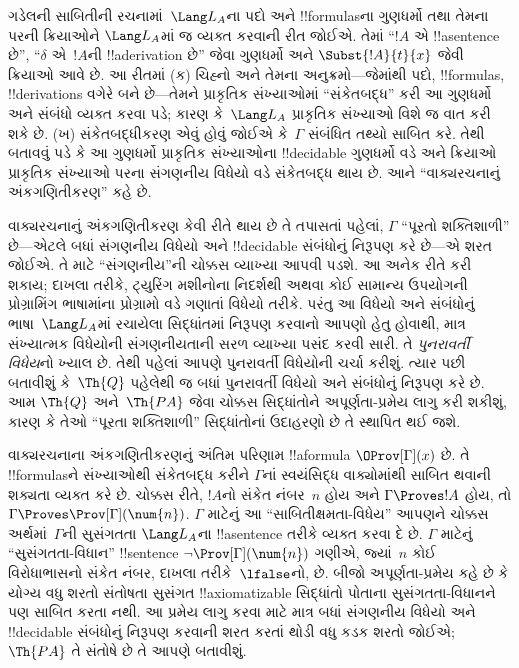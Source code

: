 \documentclass[../../../include/open-logic-section]{subfiles}
\begin{document}
ગડેલની સાબિતીની રચનામાં~$\Lang L_A$ના
પદો અને !!{formula}sના ગુણધર્મો તથા તેમના
પરની ક્રિયાઓને $\Lang L_A$માં જ વ્યક્ત કરવાની
રીત જોઈએ. તેમાં ``$!A$ એ !!a{sentence}
છે'', ``$\delta$ એ~$!A$ની
!!a{derivation} છે'' જેવા ગુણધર્મો અને
$\Subst{!A}{t}{x}$ જેવી ક્રિયાઓ આવે છે.
આ રીતમાં (ક) ચિહ્નો અને તેમના અનુક્રમો—જેમાંથી
પદો, !!{formula}s, !!{derivation}s વગેરે
બને છે—તેમને પ્રાકૃતિક સંખ્યાઓમાં ``સંકેતબદ્ધ''
કરી આ ગુણધર્મો અને સંબંધો વ્યક્ત કરવા પડે;
કારણ કે~$\Lang L_A$ પ્રાકૃતિક સંખ્યાઓ
વિશે જ વાત કરી શકે છે. (ખ) સંકેતબદ્ધીકરણ
એવું હોવું જોઈએ કે~$\Gamma$ સંબંધિત તથ્યો
સાબિત કરે. તેથી બતાવવું પડે કે આ ગુણધર્મો
પ્રાકૃતિક સંખ્યાઓના !!{decidable} ગુણધર્મો
વડે અને ક્રિયાઓ પ્રાકૃતિક સંખ્યાઓ પરના
સંગણનીય વિધેયો વડે સંકેતબદ્ધ થાય છે.
આને ``વાક્યરચનાનું અંકગણિતીકરણ'' કહે છે.

વાક્યરચનાનું અંકગણિતીકરણ કેવી રીતે થાય છે
તે તપાસતાં પહેલાં, $\Gamma$ ``પૂરતો
શક્તિશાળી'' છે—એટલે બધાં સંગણનીય વિધેયો
અને !!{decidable} સંબંધોનું નિરૂપણ
કરે છે—એ શરત જોઈએ. તે માટે
``સંગણનીય''ની ચોક્કસ વ્યાખ્યા આપવી પડશે.
આ અનેક રીતે કરી શકાય; દાખલા તરીકે,
ટ્યુરિંગ મશીનોના નિદર્શથી અથવા કોઈ
સામાન્ય ઉપયોગની પ્રોગ્રામિંગ ભાષામાંના
પ્રોગ્રામો વડે ગણાતાં વિધેયો તરીકે. પરંતુ
આ વિધેયો અને સંબંધોનું ભાષા~$\Lang L_A$માં
રચાયેલા સિદ્ધાંતમાં નિરૂપણ કરવાનો
આપણો હેતુ હોવાથી, માત્ર સંખ્યાત્મક વિધેયોની
સંગણનીયતાની સરળ વ્યાખ્યા પસંદ કરવી સારી.
તે \emph{પુનરાવર્તી વિધેય}નો ખ્યાલ છે.
તેથી પહેલાં આપણે પુનરાવર્તી વિધેયોની ચર્ચા
કરીશું. ત્યાર પછી બતાવીશું કે~$\Th{Q}$
પહેલેથી જ બધાં પુનરાવર્તી વિધેયો અને
સંબંધોનું નિરૂપણ કરે છે. આમ
$\Th{Q}$ અને~$\Th{PA}$ જેવા ચોક્કસ
સિદ્ધાંતોને અપૂર્ણતા-પ્રમેય લાગુ કરી શકીશું,
કારણ કે તેઓ ``પૂરતા શક્તિશાળી'' સિદ્ધાંતોનાં
ઉદાહરણો છે તે સ્થાપિત થઈ જશે.

વાક્યરચનાના અંકગણિતીકરણનું અંતિમ પરિણામ
!!a{formula} $\OProv[\Gamma](x)$ છે. તે
!!{formula}sને સંખ્યાઓથી સંકેતબદ્ધ કરીને
$\Gamma$નાં સ્વયંસિદ્ધ વાક્યોમાંથી સાબિત
થવાની શક્યતા વ્યક્ત કરે છે. ચોક્કસ રીતે,
$!A$નો સંકેત નંબર~$n$ હોય અને
$\Gamma \Proves !A$ હોય, તો
$\Gamma \Proves \Prov[\Gamma](\num{n})$.
$\Gamma$ માટેનું આ ``સાબિતીક્ષમતા-વિધેય''
આપણને ચોક્કસ અર્થમાં~$\Gamma$ની સુસંગતતા
$\Lang L_A$ના !!a{sentence} તરીકે વ્યક્ત
કરવા દે છે. $\Gamma$ માટેનું
``સુસંગતતા-વિધાન'' !!{sentence}
$\lnot \Prov[\Gamma](\num{n})$ ગણીએ,
જ્યાં~$n$ કોઈ વિરોધાભાસનો સંકેત નંબર,
દાખલા તરીકે~$\lfalse$નો, છે. બીજો
અપૂર્ણતા-પ્રમેય કહે છે કે યોગ્ય વધુ શરતો
સંતોષતા સુસંગત !!{axiomatizable} સિદ્ધાંતો પોતાના
સુસંગતતા-વિધાનને પણ સાબિત કરતા નથી.
આ પ્રમેય લાગુ કરવા માટે માત્ર બધાં
સંગણનીય વિધેયો અને !!{decidable}
સંબંધોનું નિરૂપણ કરવાની શરત કરતાં
થોડી વધુ કડક શરતો જોઈએ; $\Th{PA}$
તે સંતોષે છે તે આપણે બતાવીશું.
\end{document}
